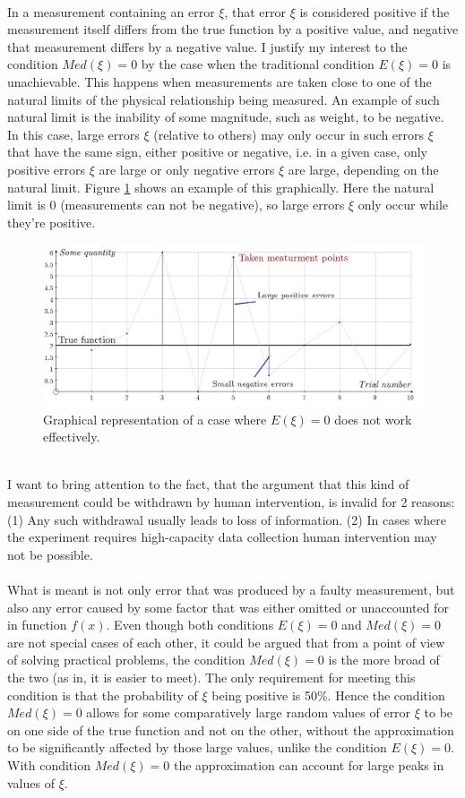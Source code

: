 \\
In a measurement containing an error $\xi$, that error $\xi$ is considered positive if the measurement itself differs from the true function by a positive value, and negative that measurement differs by a negative value. I justify my interest to the condition $Med(\xi)=0$ by the case when the traditional condition $E(\xi)=0$ is unachievable. This happens when measurements are taken close to one of the natural limits of the physical relationship being measured. An example of such natural limit is the inability of some magnitude, such as weight, to be negative. In this case, large errors $\xi$ (relative to others) may only occur in such errors $\xi$ that have the same sign, either positive or negative, i.e. in a given case, only positive errors $\xi$ are large or only negative errors $\xi$ are large, depending on the natural limit. Figure \ref{fig:graph-nl} shows an example of this graphically. Here the natural limit is 0 (measurements can not be negative), so large errors $\xi$ only occur while they're positive.
\begin{figure}[h!]
\includegraphics[scale=0.35]{updated/fig1}
\centering
\caption{Graphical representation of a case where $E(\xi)=0$ does not work effectively.}
\label{fig:graph-nl}
\end{figure}
\\
I want to bring attention to the fact, that the argument that this kind of measurement could be withdrawn by human intervention, is invalid for 2 reasons: (1) Any such withdrawal usually leads to loss of information. (2) In cases where the experiment requires high-capacity data collection human intervention may not be possible.\\
\\
What is meant is not only error that was produced by a faulty measurement, but also any error caused by some factor that was either omitted or unaccounted for in function $f(x)$. Even though both conditions $E(\xi)=0$ and $Med(\xi)=0$ are not special cases of each other, it could be argued that from a point of view of solving practical problems, the condition $Med(\xi)=0$ is the more broad of the two (as in, it is easier to meet). The only requirement for meeting this condition is that the probability of $\xi$ being positive is 50\%.  Hence the condition $Med(\xi)=0$ allows for some comparatively large random values of error $\xi$ to be on one side of the true function and not on the other, without the approximation to be significantly affected by those large values, unlike the condition $E(\xi)=0$. With condition $Med(\xi)=0$ the approximation can account for large peaks in values of $\xi$.\\
